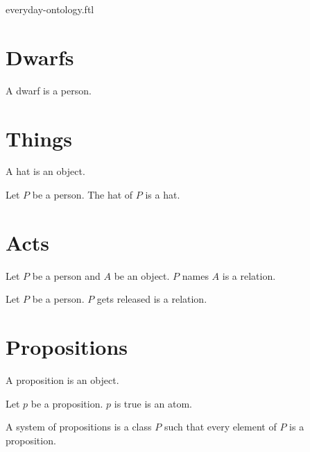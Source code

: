 \documentclass{stex}
\begin{document}
\begin{smodule}{everyday-ontology.ftl}
  \section*{Dwarfs}

  \begin{forthel}
    \begin{signature*}
      A dwarf is a person.
    \end{signature*}
  \end{forthel}


  \section*{Things}

  \begin{forthel}
    \begin{signature*}
      A hat is an object.
    \end{signature*}

    \begin{signature*}
      Let $P$ be a person.
      The hat of $P$ is a hat.
    \end{signature*}
  \end{forthel}


  \section*{Acts}

  \begin{forthel}
    \begin{signature*}
      Let $P$ be a person and $A$ be an object.
      $P$ names $A$ is a relation.
    \end{signature*}

    \begin{signature*}
      Let $P$ be a person.
      $P$ gets released is a relation.
    \end{signature*}
  \end{forthel}


  \section*{Propositions}

  \begin{forthel}
    \begin{signature*}
      A proposition is an object.
    \end{signature*}

    \begin{signature*}
      Let $p$ be a proposition.
      $p$ is true is an atom.
    \end{signature*}

    \begin{definition*}
      A system of propositions is a class $P$ such that every element of $P$ is a proposition.
    \end{definition*}
  \end{forthel}
\end{smodule}
\end{document}
